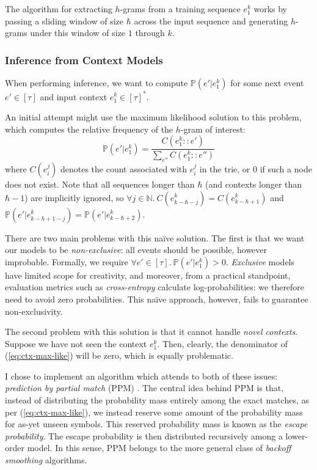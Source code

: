\documentclass[12pt,a4paper,twoside,openright]{report}
\begin{document}
The algorithm for extracting $h$-grams from a training sequence $e_1^k$ works by
passing a sliding window of size $\hbar$ across the input sequence and
generating $h$-grams under this window of size $1$ through $k$. 

\subsubsection{Inference from Context Models}

When performing inference, we want to compute $\mathbb{P}(e' | e_1^k)$ for some
next event $e' \in [\tau]$ and input context $e_1^k \in [\tau]^*$.

An initial attempt might use the maximum likelihood solution to this problem,
which computes the relative frequency of the $h$-gram of interest:
\begin{equation}
  \mathbb{P}(e'|e_1^k) = \frac{ C(e_1^k::e') }{ \sum_{e''} C(e_1^k::e'') }
  \label{eq:ctx-max-like}
\end{equation}
where $C(e_i^j)$ denotes the count associated with $e_i^j$ in the trie, or $0$
if such a node does not exist. Note that all sequences longer than $\hbar$ (and
contexts longer than $\hbar-1$) are implicitly ignored, so $\forall j \in
\mathbb{N}.\ C(e_{k-\hbar-j}^k) = C(e_{k-\hbar+1}^k)$ and
$\mathbb{P}(e'|e_{k-\hbar+1-j}^k) = \mathbb{P}(e'|e_{k-\hbar+2}^k)$.

There are two main problems with this naïve solution. The first is that we want
our models to be \emph{non-exclusive}: all events should be possible, however
improbable. Formally, we require $\forall e' \in [\tau].\ \mathbb{P}(e' | e_1^k)
> 0$. \emph{Exclusive} models have limited scope for creativity, and moreover,
from a practical standpoint, evaluation metrics such as \emph{cross-entropy}
calculate log-probabilities: we therefore need to avoid zero probabilities. This
naïve approach, however, fails to guarantee non-exclusivity.

The second problem with this solution is that it cannot handle \emph{novel
contexts}. Suppose we have not seen the context $e_1^k$. Then, clearly, the
denominator of (\ref{eq:ctx-max-like}) will be zero, which is equally
problematic.

I chose to implement an algorithm which attends to both of these issues:
\emph{prediction by partial match} (PPM) \cite{cleary1984ppm}. The central idea
behind PPM is that, instead of distributing the probability mass entirely among
the exact matches, as per (\ref{eq:ctx-max-like}), we instead reserve some
amount of the probability mass for as-yet unseen symbols. This reserved
probability mass is known as the \emph{escape probability}. The escape
probability is then distributed recursively among a lower-order model. In this
sense, PPM belongs to the more general class of \emph{backoff smoothing}
algorithms.
\end{document}
